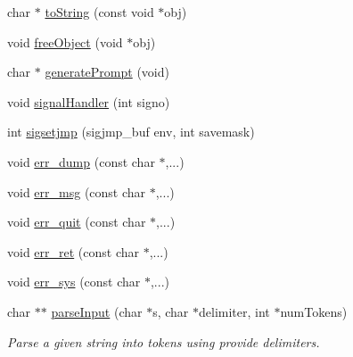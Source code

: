 \begin{DoxyCompactItemize}
\item 
char $\ast$ \hyperlink{mydash-src_2mydash_8h_a3c2b7655dfda066cd088c4f1016dd8f5}{to\-String} (const void $\ast$obj)
\item 
void \hyperlink{mydash-src_2mydash_8h_a5283309fc25706a60c6d38c80e315970}{free\-Object} (void $\ast$obj)
\item 
char $\ast$ \hyperlink{mydash-src_2mydash_8h_a7d9f284c04008b2f6ba03da29c329b7d}{generate\-Prompt} (void)
\item 
void \hyperlink{mydash-src_2mydash_8h_a138f2c50e10d96e95ce6ea4281777227}{signal\-Handler} (int signo)
\item 
int \hyperlink{mydash-src_2mydash_8h_a3202eb396cd2330f7da21b3e7a57015b}{sigsetjmp} (sigjmp\-\_\-buf env, int savemask)
\item 
void \hyperlink{mydash-src_2mydash_8h_a7149c6edbf0dd6d1da7f786d62133d16}{err\-\_\-dump} (const char $\ast$,...)
\item 
void \hyperlink{mydash-src_2mydash_8h_a5527eeda10156ad7dd2e3dbb92fa70dd}{err\-\_\-msg} (const char $\ast$,...)
\item 
void \hyperlink{mydash-src_2mydash_8h_a856c1e55e117fb3d1488ca121ef7f9c6}{err\-\_\-quit} (const char $\ast$,...)
\item 
void \hyperlink{mydash-src_2mydash_8h_a98255ebf2a46056076b0ab6e86e39d37}{err\-\_\-ret} (const char $\ast$,...)
\item 
void \hyperlink{mydash-src_2mydash_8h_a6c692d7c47e9845a3b8ac557d9edb3bd}{err\-\_\-sys} (const char $\ast$,...)
\item 
char $\ast$$\ast$ \hyperlink{mydash-src_2mydash_8h_ad9906809ff4d9f1d6b583a57c7757578}{parse\-Input} (char $\ast$s, char $\ast$delimiter, int $\ast$num\-Tokens)
\begin{DoxyCompactList}\small\item\em Parse a given string into tokens using provide delimiters. \end{DoxyCompactList}\end{DoxyCompactItemize}


